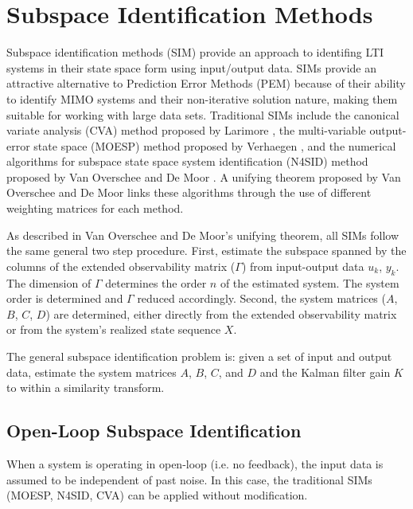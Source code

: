 \chapter{Subspace Identification Methods}
Subspace identification methods (SIM) provide an approach to identifing LTI systems in their state space form using input/output data. SIMs provide an attractive alternative to Prediction Error Methods (PEM) because of their ability to identify MIMO systems and their non-iterative solution nature, making them suitable for working with large data sets. Traditional SIMs include the canonical variate analysis (CVA) method proposed by Larimore \cite{}, the multi-variable output-error state space (MOESP) method proposed by Verhaegen \cite{}, and the numerical algorithms for subspace state space system identification (N4SID) method proposed by Van Overschee and De Moor \cite{}. A unifying theorem proposed by Van Overschee and De Moor \cite{van1995unifying} links these algorithms through the use of different weighting matrices for each method.  

As described in Van Overschee and De Moor's unifying theorem, all SIMs follow the same general two step procedure. First, estimate the subspace spanned by the columns of the extended observability matrix ($\Gamma$) from input-output data $u_k$, $y_k$. The dimension of $\Gamma$ determines the order $n$ of the estimated system. The system order is determined and $\Gamma$ reduced accordingly. Second, the system matrices ($A$, $B$, $C$, $D$) are determined, either directly from the extended observability matrix or from the system's realized state sequence $X$.

The general subspace identification problem is: given a set of input and output data, estimate the system matrices $A$, $B$, $C$, and $D$ and the Kalman filter gain $K$ to within a similarity transform.

\section{Open-Loop Subspace Identification}
When a system is operating in open-loop (i.e. no feedback), the input data is assumed to be independent of past noise. In this case, the traditional SIMs (MOESP, N4SID, CVA) can be applied without modification. 

